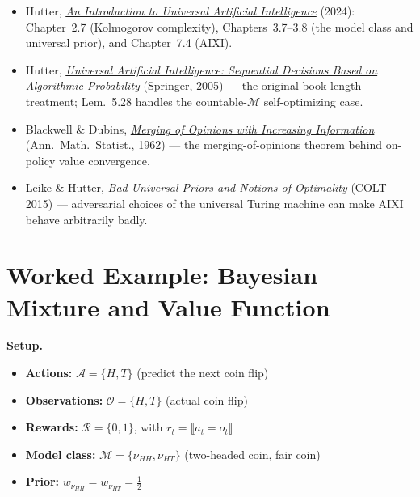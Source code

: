 \documentclass[fontsize=11pt, parskip=half]{scrartcl}
\renewcommand{\thesection}{\arabic{section}}
\newcommand{\cA}{\mathcal{A}}
\newcommand{\cO}{\mathcal{O}}
\newcommand{\cR}{\mathcal{R}}
\newcommand{\cM}{\mathcal{M}}
\begin{document}
\begin{itemize}
    \item Hutter, \href{https://www.hutter1.net/publ/uaibook2.pdf}{\emph{An
    Introduction to Universal Artificial Intelligence}} (2024): Chapter~2.7
    (Kolmogorov complexity), Chapters~3.7--3.8 (the model class and universal
    prior), and Chapter~7.4 (AIXI).
    \item Hutter, \href{http://www.hutter1.net/ai/uaibook.htm}{\emph{Universal
    Artificial Intelligence: Sequential Decisions Based on Algorithmic
    Probability}} (Springer, 2005) --- the original book-length treatment;
    Lem.~5.28 handles the countable-$\cM$ self-optimizing case.
    \item Blackwell \& Dubins, \href{https://doi.org/10.1214/aoms/1177704456}{\emph{Merging
    of Opinions with Increasing Information}} (Ann.\ Math.\ Statist., 1962) --- the
    merging-of-opinions theorem behind on-policy value convergence.
    \item Leike \& Hutter, \href{https://arxiv.org/abs/1510.04931}{\emph{Bad
    Universal Priors and Notions of Optimality}} (COLT 2015) --- adversarial
    choices of the universal Turing machine can make AIXI behave arbitrarily badly.
\end{itemize}

\clearpage
\appendix
\renewcommand{\thesection}{\Alph{section}}

\section{Worked Example: Bayesian Mixture and Value Function}\label{sec:appendix_mixture}

\begin{callout}[note]
\textbf{Setup.}
\begin{itemize}\itemsep=2pt
\item \textbf{Actions:} $\cA = \{H, T\}$ (predict the next coin flip)
\item \textbf{Observations:} $\cO = \{H, T\}$ (actual coin flip)
\item \textbf{Rewards:} $\cR = \{0, 1\}$, with $r_t = \llbracket a_t = o_t \rrbracket$
\item \textbf{Model class:} $\cM = \{\nu_{HH}, \nu_{HT}\}$ (two-headed coin, fair coin)
\item \textbf{Prior:} $w_{\nu_{HH}} = w_{\nu_{HT}} = \tfrac{1}{2}$
\end{itemize}
\end{callout}
\end{document}
